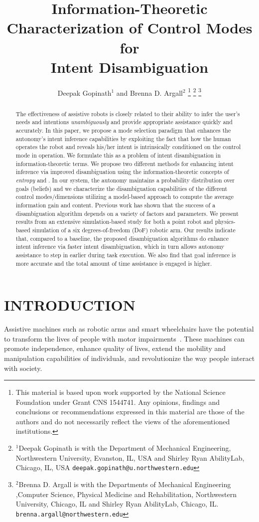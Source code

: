 \documentclass[letterpaper, 10 pt, conference]{ieeeconf}  %
\title{\LARGE \bf
Information-Theoretic Characterization of Control Modes for\\ Intent Disambiguation
}
\author{Deepak Gopinath$^{1}$ and Brenna D. Argall$^{2}$%
\thanks{This material is based upon work supported by the National Science Foundation under Grant CNS 1544741. Any opinions, findings and conclusions or
	recommendations expressed in this material are those of the authors and do
	not necessarily reflect the views of the aforementioned institutions. 
}%
\thanks{$^{1}$Deepak Gopinath is with the Department of Mechanical Engineering, Northwestern University, Evanston, IL, USA and Shirley Ryan AbilityLab, Chicago, IL, USA
        {\tt\small deepak.gopinath@u.northwestern.edu}}%
\thanks{$^{2}$Brenna D. Argall is with the Departments of Mechanical Engineering ,Computer Science, Physical Medicine and Rehabilitation, Northwestern University, Chicago, IL and Shirley Ryan AbilityLab, Chicago, IL.
        {\tt\small brenna.argall@northwestern.edu}}%
}
\begin{document}
\maketitle
\thispagestyle{empty}
\pagestyle{empty}


\begin{abstract}
The effectiveness of assistive robots is closely related to their ability to infer the user's needs and intentions \textit{unambiguously} and provide appropriate assistance quickly and accurately. In this paper, we propose a mode selection paradigm that enhances the autonomy's intent inference capabilities by exploiting the fact that how the human operates the robot and reveals his/her intent is intrinsically conditioned on the control mode in operation. We formulate this as a problem of intent disambiguation in information-theoretic terms.  We propose two different methods for enhancing intent inference via improved disambiguation using the information-theoretic concepts of \textit{entropy} and . In our system, the autonomy maintains a probability distribution over goals (beliefs) and we characterize the disambiguation capabilities of the different control modes/dimensions utilizing a model-based approach to compute the average information gain and content. 
Previous work has shown that the success of a disambiguation algorithm depends on a variety of factors and parameters. 
We present results from an extensive simulation-based study for both a point robot and physics-based simulation of a six degrees-of-freedom (DoF) robotic arm. Our results indicate that, compared to a baseline, the proposed disambiguation algorithms do enhance intent inference via faster intent disambiguation, which in turn allows autonomy assistance to step in earlier during task execution. We also find that goal inference is more accurate and the total amount of time assistance is engaged is higher.
\end{abstract}


\section{INTRODUCTION}
Assistive machines such as robotic arms and smart wheelchairs have the potential to transform the lives of people with motor impairments~\cite{laplante1992assistive}. These machines can promote independence, enhance quality of lives, extend the mobility and manipulation capabilities of individuals, and revolutionize the way people interact with society. 
\end{document}
